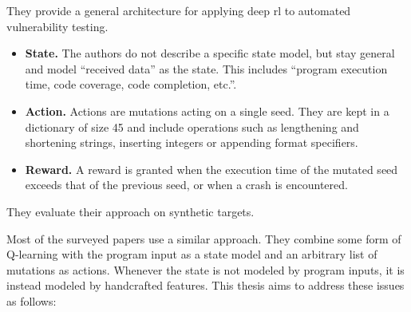 \begin{description}[style=nextline, leftmargin=0pt, labelindent=0pt, labelwidth=0pt]
  \item[Kuznetsov et al.\ (2019)~\cite{kuznetsov_automated_2019}]
    They provide a general architecture for applying deep \gls{rl} to automated vulnerability
    testing.

    \begin{itemize}
      \item \textbf{State.}
        The authors do not describe a specific state model, but stay general and
        model \enquote{received data} as the state.
        This includes \enquote{program execution time, code coverage, code completion, etc.}.

      \item \textbf{Action.}
        Actions are mutations acting on a single seed.
        They are kept in a dictionary of size \num{45} and include operations such as
        lengthening and shortening strings, inserting integers or appending format specifiers.

      \item \textbf{Reward.}
        A reward is granted when the execution time of the mutated seed exceeds that
        of the previous seed, or when a crash is encountered.

    \end{itemize}
    They evaluate their approach on synthetic targets.

\end{description}

Most of the surveyed papers use a similar approach.
They combine some form of Q-learning with the program input as a state model
and an arbitrary list of mutations as actions.
Whenever the state is not modeled by program inputs, it is instead modeled by
handcrafted features.
This thesis aims to address these issues as follows:

